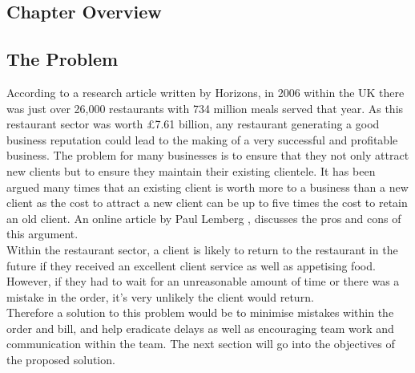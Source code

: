 \documentclass[12pt,a4paper]{article}
\newcommand\tab[1][1cm]{\hspace*{#1}}
\begin{document}
	\subsection{Chapter Overview}
	\tab{This chapter gives an introduction to the project by defining the problems encountered by restaurants,
the main objectives that the application expects to achieve and a brief introduction to existing solutions.}	
	\subsection{The Problem}
	\tab According to a research article written by Horizons\cite{Ref:10}, in 2006 within the UK there was just over 26,000
restaurants with 734 million meals served that year. As this restaurant sector was worth £7.61 billion,
any restaurant generating a good business reputation could lead to the making of a very successful
and profitable business. The problem for many businesses is to ensure that they not only attract new
clients but to ensure they maintain their existing clientele. It has been argued many times that
an existing client is worth more to a business than a new client as the cost to attract a new
client can be up to five times the cost to retain an old client. An online article by Paul Lemberg
\cite{Ref:11}, discusses the pros and cons of this argument.\\
\tab Within the restaurant sector, a client is likely to return to the restaurant in the future if they
received an excellent client service as well as appetising food. However, if they had to wait for an
unreasonable amount of time or there was a mistake in the order, it’s very unlikely the client would
return.\\
\tab Therefore a solution to this problem would be to minimise mistakes within the order and bill, and
help eradicate delays as well as encouraging team work and communication within the team.
The next section will go into the objectives of the proposed solution.
\newpage
\end{document}
